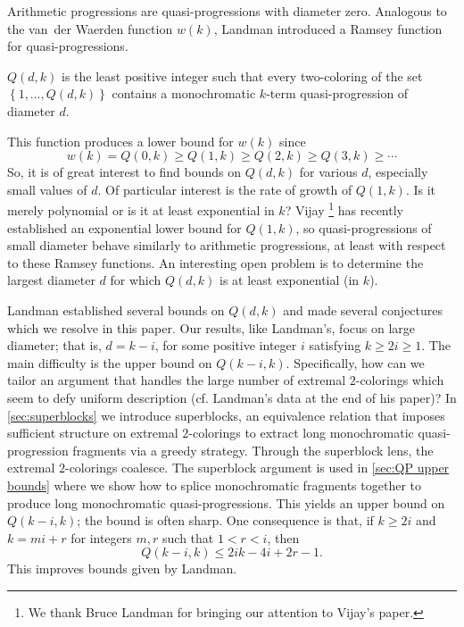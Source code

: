 Arithmetic progressions are quasi-progressions with diameter zero.
Analogous to the van~der Waerden function $w(k)$, Landman \cite{L,LR} introduced a Ramsey function for quasi-progressions.
\begin{definition} $Q(d,k)$ is the least positive integer such that every two-coloring of the set $\left\{1, \ldots, Q(d,k)\right\}$ contains a monochromatic $k$-term quasi-progression of diameter $d$.
\end{definition}

This function produces a lower bound for $w(k)$ since \[w(k) = Q(0,k) \geq Q(1,k) \geq Q(2,k) \geq Q(3,k) \geq \cdots\] So, it is of great interest to find bounds on $Q(d,k)$ for various $d$, especially small values of $d$. Of particular interest is the rate of growth of $Q(1,k)$. Is it merely polynomial or is it at least exponential in $k$?  Vijay \cite{V}\footnote{We thank Bruce Landman for bringing our attention to Vijay's paper.} has recently established an exponential lower bound for $Q(1,k)$, so quasi-progressions of small diameter behave similarly to arithmetic progressions, at least with respect to these Ramsey functions. An interesting open problem is to determine the largest diameter $d$ for which $Q(d,k)$ is at least exponential (in $k$).

Landman established several bounds on $Q(d,k)$ and made several conjectures which we resolve in this paper. Our results, like Landman's, focus on large diameter; that is, $d = k-i$, for some positive integer $i$ satisfying $k\geq 2i \geq 1$. The main difficulty is the upper bound on $Q(k-i,k)$. Specifically, how can we tailor an argument that handles the large number of extremal $2$-colorings which seem to defy uniform description (cf. Landman's data at the end of his paper)? In \autoref{sec:superblocks} we introduce superblocks, an equivalence relation that imposes sufficient structure on extremal $2$-colorings to extract long monochromatic quasi-progression fragments via a greedy strategy. Through the superblock lens, the extremal $2$-colorings coalesce. The superblock argument is used in \autoref{sec:QP upper bounds} where we show how to splice monochromatic fragments together to produce long monochromatic quasi-progressions. This yields an upper bound on $Q(k-i,k)$; the bound is often sharp. One consequence is that, if $k \geq 2i$ and $k=mi+r$ for integers $m,r$ such that $1 < r < i$, then \[Q(k-i,k) \leq 2ik-4i+2r-1.\] This improves bounds given by Landman.

